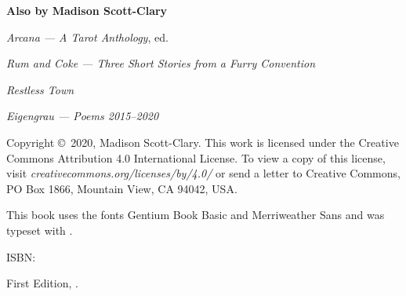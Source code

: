 
\thispagestyle{empty}
\null
\vfill
\begin{center}
    \noindent\textbf{Also by Madison Scott-Clary}

    \emph{Arcana --- A Tarot Anthology}, ed.

    \emph{Rum and Coke --- Three Short Stories from a Furry Convention}

    \emph{Restless Town}

    \emph{Eigengrau --- Poems 2015--2020}
\end{center}
\vfill
\singlespacing
{\small\parindent0pt\parskip5pt
\noindent Copyright \copyright\ 2020, Madison Scott-Clary. This work is licensed under the Creative Commons Attribution 4.0 International License. To view a copy of this license, visit \mbox{\emph{creativecommons.org/licenses/by/4.0/}} or send a letter to Creative Commons, PO Box 1866, Mountain View, CA 94042, USA.

This book uses the fonts Gentium Book Basic and  {\allyFont Merriweather Sans} and was typeset with {\XeLaTeX}.

\vspace{1ex}

ISBN: \ISBN


\vspace{1ex}

\emph{\Title}

\vspace{1ex}

First Edition, \Year.

\EditionsList
}

\cleardoublepage
